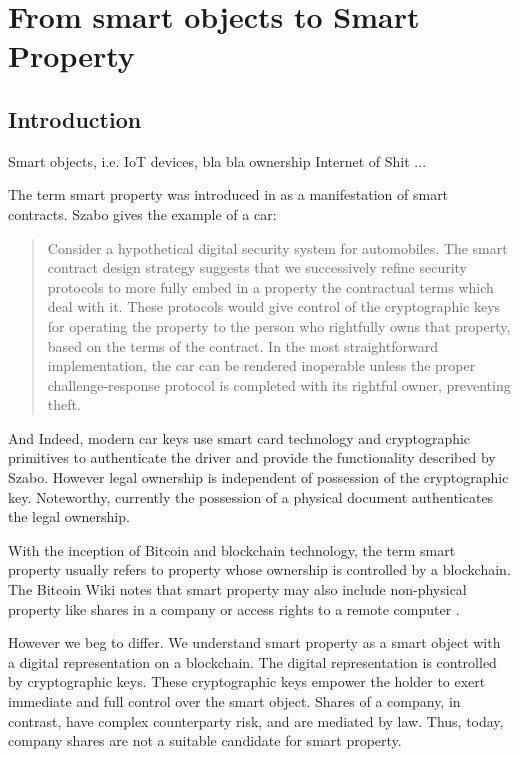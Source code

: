 \chapter{From smart objects to Smart Property}
\label{sec:dao}


\section{Introduction}

Smart objects, i.e. IoT devices, bla bla ownership Internet of Shit ...


The term smart property was introduced in \cite{szabo1997} as a manifestation of smart contracts. Szabo gives the example of a car:
\begin{quote}
Consider a hypothetical digital security system for automobiles. The smart contract design strategy suggests that we successively refine security protocols to more fully embed in a property the contractual terms which deal with it. These protocols would give control of the cryptographic keys for operating the property to the person who rightfully owns that property, based on the terms of the contract. In the most straightforward implementation, the car can be rendered inoperable unless the proper challenge-response protocol is completed with its rightful owner, preventing theft.
\end{quote}

And Indeed, modern car keys use smart card technology and cryptographic primitives to authenticate the driver and provide the functionality described by Szabo. However legal ownership is independent of possession of the cryptographic key. Noteworthy, currently the possession of a physical document authenticates the legal ownership. 

With the inception of Bitcoin and blockchain technology, the term smart property usually refers to property whose ownership is controlled by a blockchain.
The Bitcoin Wiki notes that smart property may also include non-physical property like shares in a company or access rights to a remote computer \parencite{smartproperty2011}. 

However we beg to differ. We understand smart property as a smart object with a digital representation on a blockchain. The digital representation is controlled by cryptographic keys. These cryptographic keys empower the holder to exert immediate and full control over the smart object. Shares of a company, in contrast, have complex counterparty risk, and are mediated by law. Thus, today, company shares are not a suitable candidate for smart property.

